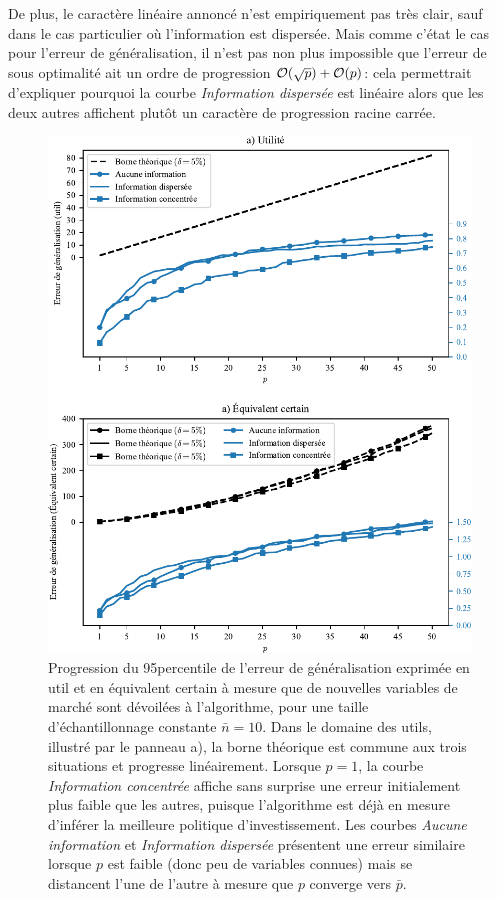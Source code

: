 De plus, le caractère linéaire annoncé n'est empiriquement pas très clair, sauf dans le
cas particulier où l'information est dispersée. Mais comme c'état le cas pour l'erreur de
généralisation, il n'est pas non plus impossible que l'erreur de sous optimalité ait un
ordre de progression $\mathcal O(\sqrt{p}) + \mathcal O(p)$: cela permettrait d'expliquer pourquoi
la courbe \textit{Information dispersée} est linéaire alors que les deux autres affichent
plutôt un caractère de progression racine carrée.
\newpage

\begin{figure}[h!]
  \centering
  \includegraphics[width=1\textwidth]{../experiments/fig/pconst_infogen2.pdf}
  \caption{Progression du 95\ieme percentile de l'erreur de généralisation exprimée en
    util et en équivalent certain à mesure que de nouvelles variables de marché sont
    dévoilées à l'algorithme, pour une taille d'échantillonnage constante $\bar n =
    10$. Dans le domaine des utils, illustré par le panneau a), la borne théorique est
    commune aux trois situations et progresse linéairement. Lorsque $p=1$, la courbe
    \textit{Information concentrée} affiche sans surprise une erreur initialement plus
    faible que les autres, puisque l'algorithme est déjà en mesure d'inférer la meilleure
    politique d'investissement. Les courbes \textit{Aucune information} et
    \textit{Information dispersée} présentent une erreur similaire lorsque $p$ est faible
    (donc peu de variables connues) mais se distancent l'une de l'autre à mesure que $p$
    converge vers $\bar p$.}
  \label{fig_pconst_infogen}
\end{figure}

